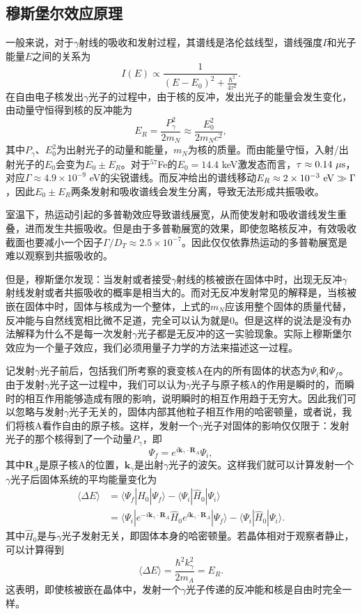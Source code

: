 \documentclass[font=default]{mpltx}
\begin{document}
\subsection{穆斯堡尔效应原理}
一般来说，对于$\gamma$射线的吸收和发射过程，其谱线是洛伦兹线型，谱线强度$I$和光子能量$E$之间的关系为$$I(E)\propto\frac{1}{(E-E_0)^2+\frac{\hbar^2}{4\tau^2}}.$$在自由电子核发出$\gamma$光子的过程中，由于核的反冲，发出光子的能量会发生变化，由动量守恒得到核的反冲能为$$E_R=\frac{P_\gamma^2}{2m_N}\approx\frac{E_0^2}{2m_Nc^2},$$其中$P_\gamma$、$E_0^2$为出射光子的动量和能量，$m_N$为核的质量。而由能量守恒，入射/出射光子的$E_0$会变为$E_0\pm E_R$。对于$^{57}$Fe的$E_0=14.4$ keV激发态而言，$\tau\approx0.14\ {\rm \mu s}$，对应$\Gamma\approx4.9\times10^{-9}$ eV的尖锐谱线。而反冲给出的谱线移动$E_R\approx2\times10^{-3}\ {\rm eV}\gg\Gamma$，因此$E_0\pm E_R$两条发射和吸收谱线会发生分离，导致无法形成共振吸收。

室温下，热运动引起的多普勒效应导致谱线展宽，从而使发射和吸收谱线发生重叠，进而发生共振吸收。但是由于多普勒展宽的效果，即使忽略核反冲，有效吸收截面也要减小一个因子$\Gamma/D_T\approx2.5\times10^{-7}$。因此仅仅依靠热运动的多普勒展宽是难以观察到共振吸收的。

但是，穆斯堡尔发现：当发射或者接受$\gamma$射线的核被嵌在固体中时，出现无反冲$\gamma$射线发射或者共振吸收的概率是相当大的。而对无反冲发射常见的解释是，当核被嵌在固体中时，固体与核成为一个整体，上式的$m_N$应该用整个固体的质量代替，反冲能与自然线宽相比微不足道，完全可以认为就是0。但是这样的说法是没有办法解释为什么不是每一次发射$\gamma$光子都是无反冲的这一实验现象。实际上穆斯堡尔效应为一个量子效应，我们必须用量子力学的方法来描述这一过程。

记发射$\gamma$光子前后，包括我们所考察的衰变核A在内的所有固体的状态为$\Psi_i$和$\Psi_f$。由于发射$\gamma$光子这一过程中，我们可以认为$\gamma$光子与原子核A的作用是瞬时的，而瞬时的相互作用能够造成有限的影响，说明瞬时的相互作用趋于无穷大。因此我们可以忽略与发射$\gamma$光子无关的，固体内部其他粒子相互作用的哈密顿量，或者说，我们将核A看作自由的原子核。这样，发射一个$\gamma$光子对固体的影响仅仅限于：发射光子的那个核得到了一个动量$P_\gamma$，即$$\Psi_f=e^{i\bm{k}_\gamma\cdot \bm{R}_A}\Psi_i,$$其中$\bm{R}_A$是原子核A的位置，$\bm{k}_\gamma$是出射$\gamma$光子的波矢。这样我们就可以计算发射一个$\gamma$光子后固体系统的平均能量变化为
$$\begin{aligned}
  \langle\Delta E\rangle&=\langle\Psi_f|\hat{H}_0|\Psi_f\rangle-\langle\Psi_i|\hat{H}_0|\Psi_i\rangle\\
  &=\langle\Psi_i|e^{-i\bm{k}_\gamma\cdot \bm{R}_A}\hat{H}_0e^{i\bm{k}_\gamma\cdot \bm{R}_A}|\Psi_f\rangle-\langle\Psi_i|\hat{H}_0|\Psi_i\rangle.
\end{aligned}$$其中$\hat{H}_0$是与$\gamma$光子发射无关，即固体本身的哈密顿量。若晶体相对于观察者静止，可以计算得到$$\langle\Delta E\rangle=\frac{\hbar^2k_\gamma^2}{2m_A}=E_R.$$这表明，即使核被嵌在晶体中，发射一个$\gamma$光子传递的反冲能和核是自由时完全一样。
\end{document}
